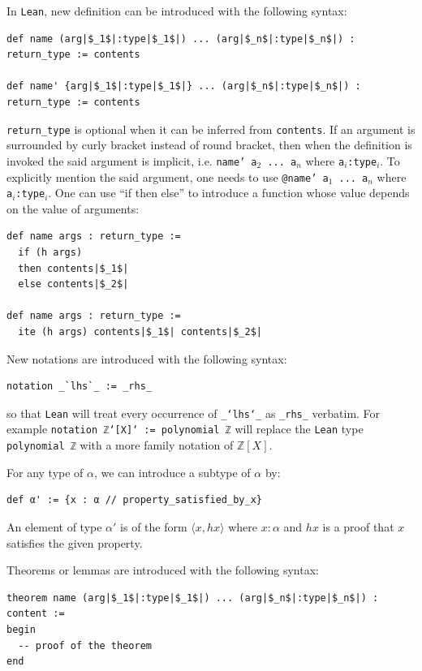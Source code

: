 \documentclass{report}
\theoremstyle{definition}
\begin{document}
In {\tt \small Lean}, new definition can be introduced with the following syntax:
\begin{verbatim}
def name (arg|$_1$|:type|$_1$|) ... (arg|$_n$|:type|$_n$|) : return_type := contents

def name' {arg|$_1$|:type|$_1$|} ... (arg|$_n$|:type|$_n$|) : return_type := contents
\end{verbatim}
{\tt \small return\_type} is optional when it can be inferred from {\tt \small contents}. If an argument is surrounded by curly bracket instead of round bracket, then when the definition is invoked the said argument is implicit, i.e. {\tt \small name' a$_2$ ... a$_n$} where {\tt \small a$_i$:type$_i$}. To explicitly mention the said argument, one needs to use {\tt \small @name' a$_1$ ... a$_n$} where {\tt \small a$_i$:type$_i$}. One can use ``if then else'' to introduce a function whose value depends on the value of arguments:
\begin{verbatim}
def name args : return_type :=
  if (h args)
  then contents|$_1$|
  else contents|$_2$|

def name args : return_type := 
  ite (h args) contents|$_1$| contents|$_2$|
\end{verbatim}

New notations are introduced with the following syntax:
\begin{verbatim}
notation _`lhs`_ := _rhs_
\end{verbatim}
so that {\tt \small Lean} will treat every occurrence of {\tt \small \_`lhs`\_} as {\tt \small \_rhs\_} verbatim. For example \texttt{notation ℤ`[X]` := polynomial ℤ} will replace the {\tt \small Lean} type {\tt \small polynomial ℤ} with a more family notation of $\mathbb{Z}[X]$.

For any type of $\alpha$, we can introduce a subtype of $\alpha$ by:
\begin{verbatim}
def α' := {x : α // property_satisfied_by_x}
\end{verbatim}
An element of type $\alpha'$ is of the form $\langle x, hx\rangle$ where $x:\alpha$ and $hx$ is a proof that $x$ satisfies the given property.

Theorems or lemmas are introduced with the following syntax:
\begin{verbatim}
theorem name (arg|$_1$|:type|$_1$|) ... (arg|$_n$|:type|$_n$|) : content :=
begin
  -- proof of the theorem
end
\end{verbatim}
\end{document}
